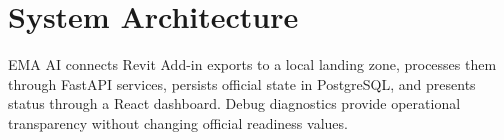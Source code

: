 \section{System Architecture}
EMA AI connects Revit Add-in exports to a local landing zone, processes them through FastAPI services, persists official state in PostgreSQL, and presents status through a React dashboard. Debug diagnostics provide operational transparency without changing official readiness values.

